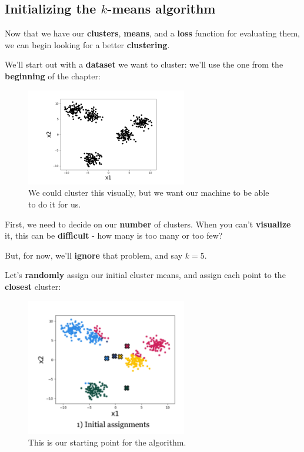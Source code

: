     \subsection*{Initializing the $k$-means algorithm}
    
        Now that we have our \textbf{clusters}, \textbf{means}, and a \textbf{loss} function for evaluating them, we can begin looking for a better \textbf{clustering}.
        
        We'll start out with a \textbf{dataset} we want to cluster: we'll use the one from the \textbf{beginning} of the chapter:
        
        \begin{figure}[H]
            \centering
            \includegraphics[width=70mm,scale=0.4]{images/clustering_images/clustering_example.png}
            \caption*{We could cluster this visually, but we want our machine to be able to do it for us.}
        \end{figure}
        
        First, we need to decide on our \textbf{number} of clusters. When you can't \textbf{visualize} it, this can be \textbf{difficult} - how many is too many or too few? 
        
        But, for now, we'll \textbf{ignore} that problem, and say $k=5$. 
        
        Let's \textbf{randomly} assign our initial cluster means, and assign each point to the \textbf{closest} cluster:
        
        \begin{figure}[H]
            \centering
            \includegraphics[width=70mm,scale=0.4]{images/clustering_images/initialization_cluster.png}
            \caption*{This is our starting point for the algorithm.}
        \end{figure}
    
